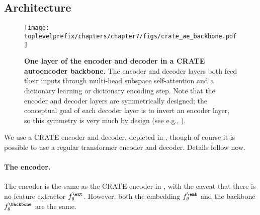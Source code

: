 \documentclass[../../book-main.tex]{subfiles}
\begin{document}
\subsection{Architecture}\label{sub:image_completion_architecture}

\begin{figure}
    \centering 
    \texttt{[image: \\toplevelprefix/chapters/chapter7/figs/crate\_ae\_backbone.pdf]}
    \caption{\small\textbf{One layer of the encoder and decoder in a CRATE autoencoder backbone.} The encoder and decoder layers both feed their inputs through multi-head subspace self-attention and a dictionary learning or dictionary encoding step. Note that the encoder and decoder layers are symmetrically designed; the conceptual goal of each decoder layer is to invert an encoder layer, so this symmetry is very much by design (see e.g., ).}
\end{figure}

We use a CRATE encoder and decoder, depicted in , though of course it is possible to use a regular transformer encoder and decoder. Details follow now.

\paragraph{The encoder.} The encoder is the same as the CRATE encoder in , with the caveat that there is no feature extractor \(f_{\theta}^{\ext}\). However, both the embedding \(f_{\theta}^{\emb}\) and the backbone \(f_{\theta}^{\backbone}\) are the same.
\end{document}
